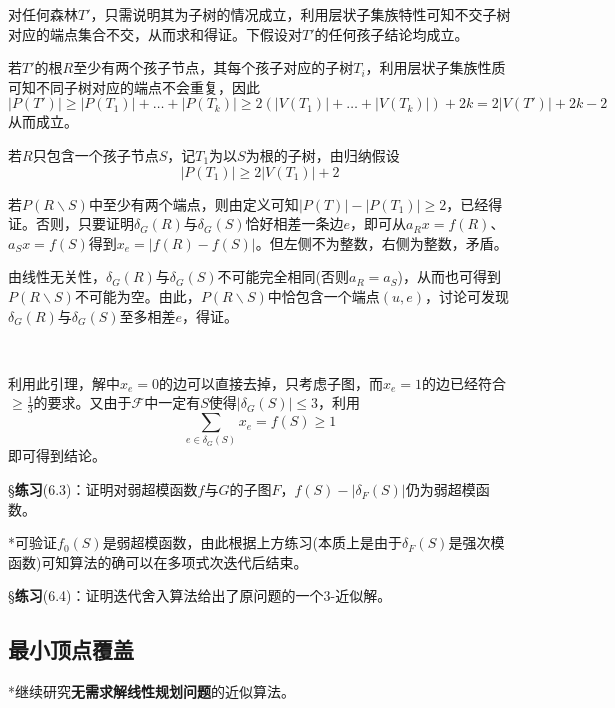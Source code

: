 \documentclass[a4paper,UTF8,fontset=windows]{ctexart}
\newcommand{\exce}[2]{\S\textbf{练习}(#1)：{\kaishu #2}}
\begin{document}
{\begin{enumerate}
        对任何森林$T'$，只需说明其为子树的情况成立，利用层状子集族特性可知不交子树对应的端点集合不交，从而求和得证。下假设对$T'$的任何孩子结论均成立。
        
        若$T'$的根$R$至少有两个孩子节点，其每个孩子对应的子树$T_i$，利用层状子集族性质可知不同子树对应的端点不会重复，因此
        $$|P(T')|\ge|P(T_1)|+\dots+|P(T_k)|\ge2(|V(T_1)|+\dots+|V(T_k)|)+2k=2|V(T')|+2k-2$$
        从而成立。

        若$R$只包含一个孩子节点$S$，记$T_1$为以$S$为根的子树，由归纳假设
        $$|P(T_1)|\ge 2|V(T_1)|+2$$

        若$P(R\backslash S)$中至少有两个端点，则由定义可知$|P(T)|-|P(T_1)|\ge2$，已经得证。否则，只要证明$\delta_G(R)$与$\delta_G(S)$恰好相差一条边$e$，即可从$a_Rx=f(R)$、$a_Sx=f(S)$得到$x_e=|f(R)-f(S)|$。但左侧不为整数，右侧为整数，矛盾。

        由线性无关性，$\delta_G(R)$与$\delta_G(S)$不可能完全相同(否则$a_R=a_S$)，从而也可得到$P(R\backslash S)$不可能为空。由此，$P(R\backslash S)$中恰包含一个端点$(u,e)$，讨论可发现$\delta_G(R)$与$\delta_G(S)$至多相差$e$，得证。

    \end{enumerate}

    \

    利用此引理，解中$x_e=0$的边可以直接去掉，只考虑子图，而$x_e=1$的边已经符合$\ge\frac{1}{3}$的要求。又由于$\mathcal{F}$中一定有$S$使得$|\delta_G(S)|\le3$，利用
    $$\sum_{e\in\delta_G(S)}x_e=f(S)\ge1$$
    即可得到结论。
}

\exce{6.3}{证明对弱超模函数$f$与$G$的子图$F$，$f(S)-|\delta_F(S)|$仍为弱超模函数。}

*可验证$f_0(S)$是弱超模函数，由此根据上方练习(本质上是由于$\delta_F(S)$是强次模函数)可知算法的确可以在多项式次迭代后结束。

\exce{6.4}{证明迭代舍入算法给出了原问题的一个3-近似解。}

\subsection{最小顶点覆盖}
*继续研究\textbf{无需求解线性规划问题}的近似算法。
\end{document}
